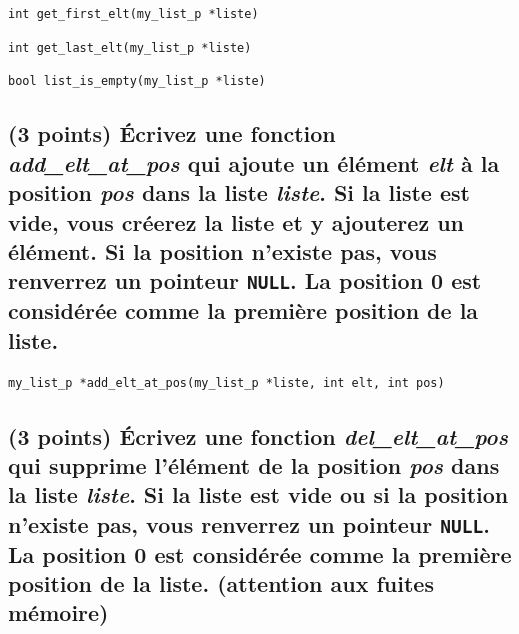 \documentclass[11pt,a4paper]{article}
\begin{document}
\newpage

\vfillFirst

\texttt{int get\_first\_elt(my\_list\_p *liste)}

\begin{center}
\end{center}

\medskip

\texttt{int get\_last\_elt(my\_list\_p *liste)}

\begin{center}
\end{center}

\medskip

\texttt{bool list\_is\_empty(my\_list\_p *liste)}

\begin{center}
\end{center}


\vfillLast

\newpage

\subsection{(3 points) \'Ecrivez une fonction \og \textit{add\_elt\_at\_pos} \fg{} qui ajoute un élément \textit{elt} à la position \textit{pos} dans la liste \textit{liste}. Si la liste est vide, vous créerez la liste et y ajouterez un élément. Si la position n'existe pas, vous renverrez un pointeur \texttt{NULL}. La position 0 est considérée comme la première position de la liste. }

\bigskip

\texttt{my\_list\_p *add\_elt\_at\_pos(my\_list\_p *liste, int elt, int pos)}

\begin{center}
\end{center}

\newpage

\subsection{(3 points) \'Ecrivez une fonction \og \textit{del\_elt\_at\_pos} \fg{} qui supprime l'élément de la position \textit{pos} dans la liste \textit{liste}. Si la liste est vide ou si la position n'existe pas, vous renverrez un pointeur \texttt{NULL}. La position 0 est considérée comme la première position de la liste. (attention aux fuites mémoire) }
\end{document}
